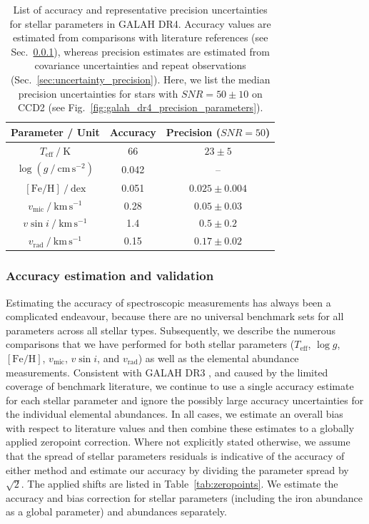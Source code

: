 \documentclass[
  journal=pasa,
  manuscript=research-paper, %
  year=2024,
  volume=37
]{cup-journal}
\newcommand{\Teff}{$T_\mathrm{eff}$\xspace}
\newcommand{\logg}{$\log g$\xspace}
\newcommand{\feh}{$\mathrm{[Fe/H]}$\xspace}
\newcommand{\vmic}{$v_\mathrm{mic}$\xspace}
\newcommand{\vsini}{$v \sin i$\xspace}
\newcommand{\vrad}{$v_\mathrm{rad}$\xspace}
\begin{document}
\begin{table}[ht]
\centering
\caption{List of accuracy and representative precision uncertainties for stellar parameters in GALAH DR4. Accuracy values are estimated from comparisons with literature references (see Sec.~\ref{sec:uncertainty_accuracy}), whereas precision estimates are estimated from covariance uncertainties and repeat observations (Sec.~\ref{sec:uncertainty_precision}). Here, we list the median precision uncertainties for stars with $SNR = 50 \pm 10$ on CCD2 (see Fig.~\ref{fig:galah_dr4_precision_parameters}).}
\label{tab:accuracy_precision}
\begin{tabular}{ccc}
\hline \hline
Parameter / Unit & Accuracy & Precision ($SNR = 50$)\\
\hline
$T_\text{eff}~/~\mathrm{K}$          & 66     & $23 \pm 5$ \\
$\log (g~/~\mathrm{cm\,s^{-2}})$     &  0.042 & -- \\
$\mathrm{[Fe/H]}~/~\mathrm{dex}$     &  0.051 & $0.025 \pm 0.004$ \\
$v_\text{mic}~/~\mathrm{km\,s^{-1}}$ &  0.28  & $0.05 \pm 0.03$ \\
$v \sin i~/~\mathrm{km\,s^{-1}}$     &  1.4   & $0.5 \pm 0.2$ \\
$v_\text{rad}~/~\mathrm{km\,s^{-1}}$ &  0.15  & $0.17 \pm 0.02$ \\
\hline
\end{tabular}
\end{table}

\subsubsection{Accuracy estimation and validation} \label{sec:uncertainty_accuracy}

Estimating the accuracy of spectroscopic measurements has always been a complicated endeavour, because there are no universal benchmark sets for all parameters across all stellar types. Subsequently, we describe the numerous comparisons that we have performed for both stellar parameters (\Teff, \logg, \feh, \vmic, \vsini, and \vrad) as well as the elemental abundance measurements. Consistent with GALAH DR3 \citep{Buder2021}, and caused by the limited coverage of benchmark literature, we continue to use a single accuracy estimate for each stellar parameter and ignore the possibly large accuracy uncertainties for the individual elemental abundances. In all cases, we estimate an overall bias with respect to literature values and then combine these estimates to a globally applied zeropoint correction. Where not explicitly stated otherwise, we assume that the spread of stellar parameters residuals is indicative of the accuracy of either method and estimate our accuracy by dividing the parameter spread by $\sqrt{2}$. The applied shifts are listed in Table~\ref{tab:zeropoints}. We estimate the accuracy and bias correction for stellar parameters (including the iron abundance as a global parameter) and abundances separately.
\end{document}
